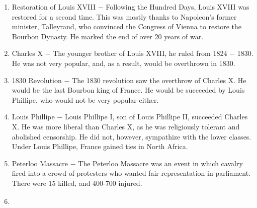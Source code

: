 \documentclass[12pt]{article}
\begin{document}
\begin{enumerate}
\item Restoration of Louis XVIII $-$ Following the Hundred Days, Louis XVIII  was restored for a second time. This was mostly thanks to Napoleon's former minister, Talleyrand, who convinced the Congress of Vienna to restore the Bourbon Dynasty. He marked the end of over 20 years of war.

\item Charles X $-$ The younger brother of Louis XVIII, he ruled from 1824 $-$ 1830. He was not very popular, and, as a result, would be overthrown in 1830.

\item 1830 Revolution $-$ The 1830 revolution saw the overthrow of Charles X. He would be the last Bourbon king of France. He would be succeeded by Louis Phillipe, who would not be very popular either.

\item Louis Phillipe $-$ Louis Phillipe I, son of Louis Phillipe II, succeeded Charles X. He was more liberal than Charles X, as he was religiously tolerant and abolished censorship. He did not, however, sympathize with the lower classes. Under Louis Phillipe, France gained ties in North Africa.

\item Peterloo Massacre $-$ The Peterloo Massacre was an event in which cavalry fired into a crowd of protesters who wanted fair representation in parliament. There were 15 killed, and 400-700 injured.

\item \begin{tabular}{p{} p{} p{}}


\end{tabular}
\end{enumerate}
\end{document}
